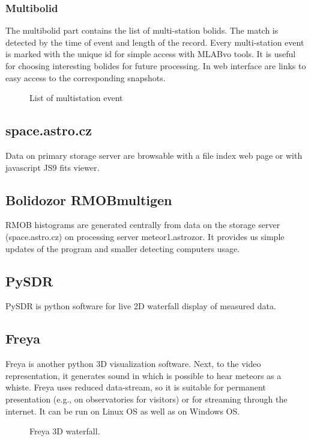 \documentclass[10pt,a4paper,twoside,dvips]{article}
\begin{document}
\begin{IMCpaper}
\subsubsection{Multibolid}
The multibolid part contains the list of multi-station bolids. The match is detected by the time of event and length of the record. Every multi-station event is marked with the unique id for simple access with MLABvo tools. It is useful for choosing interesting bolides for future processing. In web interface are links to easy access to the corresponding snapshots.


\begin{figure}[htb]
\centering
{}
\caption{List of multistation event}%
\label{RTBb}
\end{figure}

\subsection{space.astro.cz}
Data on primary storage server are browsable with a file index web page or with javascript JS9 fits viewer.                                                     

\subsection{Bolidozor RMOBmultigen}
RMOB histograms are generated centrally from data on the storage server (space.astro.cz) on processing server meteor1.astrozor. It provides us simple updates of the program and smaller detecting computers usage.                                                         


\subsection{PySDR}
PySDR is python software for live 2D waterfall display of measured data.                                                  
\subsection{Freya}
Freya is another python 3D visualization software. Next, to the video representation, it generates sound in which is possible to hear meteors as a whiste. Freya uses reduced data-stream, so it is suitable for permanent presentation (e.g., on observatories for visitors) or for streaming through the internet. It can be run on Linux OS as well as on Windows OS.                                                                                    

\begin{figure}[htb]
\centering
{}
\caption{Freya 3D waterfall.}%
\label{RTBmmap}
\end{figure}

                                                                                                                           
%
%

\end{IMCpaper}
\end{document}
